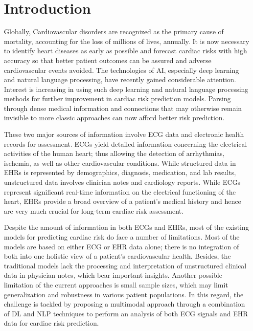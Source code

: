 \section{Introduction } 

Globally, Cardiovascular disorders are recognized as the primary cause of mortality, accounting for the loss of millions of lives, annually. It is now necessary to identify heart diseases as early as possible and forecast cardiac risks with high accuracy so that better patient outcomes can be assured and adverse cardiovascular events avoided. The technologies of AI, especially deep learning and natural language processing, have recently gained considerable attention. Interest is increasing in using such deep learning and natural language processing methods for further improvement in cardiac risk prediction models. Parsing through dense medical information and connections that may otherwise remain invisible to more classic approaches can now afford better risk prediction.

\vspace{0.5cm}
These two major sources of information involve ECG data and electronic health records for assessment. ECGs yield detailed information concerning the electrical activities of the human heart; thus allowing the detection of arrhythmias, ischemia, as well as other cardiovascular conditions. While structured data in EHRs is represented by demographics, diagnosis, medication, and lab results, unstructured data involves clinician notes and cardiology reports. While ECGs represent significant real-time information on the electrical functioning of the heart, EHRs provide a broad overview of a patient's medical history and hence are very much crucial for long-term cardiac risk assessment.
 
\vspace{0.5cm}
Despite the amount of information in both ECGs and EHRs, most of the existing models for predicting cardiac risk do face a number of limitations. Most of the models are based on either ECG or EHR data alone; there is no integration of both into one holistic view of a patient's cardiovascular health. Besides, the traditional models lack the processing and interpretation of unstructured clinical data in physician notes, which bear important insights. Another possible limitation of the current approaches is small sample sizes, which may limit generalization and robustness in various patient populations. In this regard, the challenge is tackled by proposing a multimodal approach through a combination of DL and NLP techniques to perform an analysis of both ECG signals and EHR data for cardiac risk prediction. 
\vspace{1.0cm}

